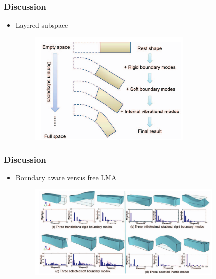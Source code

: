 \documentclass[serif,mathserif, 12pt]{beamer}
\begin{document}
\begin{frame}
  \frametitle{Discussion}
  \begin{itemize}
  \item Layered subspace
     {
    \begin{figure}
      \centering
      \includegraphics[width=0.75\textwidth]{img/layered_subspace}
    \end{figure}
    }
  \end{itemize}
\end{frame}

\begin{frame}
  \frametitle{Discussion}
  \begin{itemize}
  \item Boundary aware versus free LMA
    \begin{figure}
      \centering
      \includegraphics[width=0.9\textwidth]{img/bnd_vs_LMA}
    \end{figure}
  \end{itemize}
\end{frame}
\end{document}
